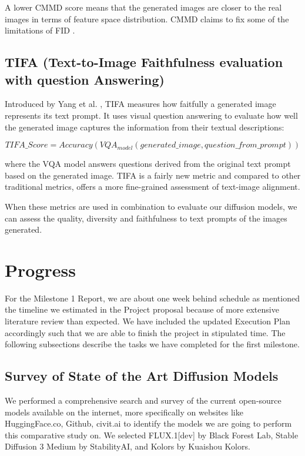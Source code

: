 \documentclass{article}
\begin{document}
A lower CMMD score means that the generated images are closer to the real images in terms of feature space distribution. CMMD claims to 
fix some of the limitations of FID \cite{rethinkingFID2024}.

\subsection{TIFA (Text-to-Image Faithfulness evaluation with question Answering)}

Introduced by Yang et al. \cite{yang2022empirical}, TIFA measures how faitfully a generated image represents its text prompt.
It uses visual question answering to evaluate how well the generated image captures the information from their textual descriptions:

\begin{equation}
    TIFA\_Score = Accuracy(VQA_{model}(generated\_image, question\_from\_prompt))
\end{equation}

where the VQA model answers questions derived from the original text prompt based on the generated image. 
TIFA is a fairly new metric and compared to other traditional metrics, offers a more fine-grained assessment of text-image alignment.

When these metrics are used in combination to evaluate our diffusion models, we can assess the quality, diversity and faithfulness
to text prompts of the images generated.


\section{Progress}
For the Milestone 1 Report, we are about one week behind schedule as mentioned the timeline we estimated in the Project proposal because of more extensive literature review than expected. We have included the updated Execution Plan accordingly such that we are able to finish the project in stipulated time. The following subsections describe the tasks we have completed for the first milestone.

\subsection{Survey of State of the Art Diffusion Models}
We performed a comprehensive search and survey of the current open-source models available on the internet, more specifically on websites like HuggingFace.co, Github, civit.ai to identify the models we are going to perform this comparative study on. We selected FLUX.1[dev] by Black Forest Lab, Stable Diffusion 3 Medium by StabilityAI, and Kolors by Kuaishou Kolors.
\end{document}
